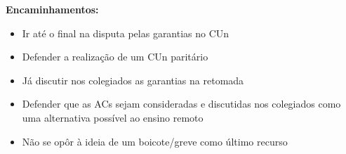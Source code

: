 \documentclass{ata-calico}
\begin{document}
\textbf{Encaminhamentos:}
\begin{itemize}
\item Ir até o final na disputa pelas garantias no CUn
\item Defender a realização de um CUn paritário
\item Já discutir nos colegiados as garantias na retomada
\item Defender que as ACs sejam consideradas e discutidas nos colegiados como uma alternativa possível ao ensino remoto
\item Não se opôr à ideia de um boicote/greve como último recurso
\end{itemize}

\end{document}
